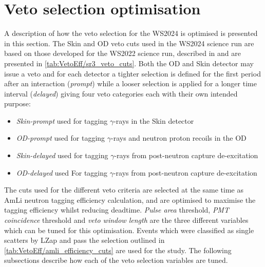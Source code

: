 \section{Veto selection optimisation}\label{sec:VetoEff/VetoSelectionOptimisation}
A description of how the veto selection for the WS2024 is optimised is presented in this section. The Skin and OD veto cuts used in the WS2024 science run are based on those developed for the WS2022 science run, described in \cite{LZ:2022lsv} and are presented in \autoref{tab:VetoEff/sr3_veto_cuts}.
Both the OD and Skin detector may issue a veto and for each detector a tighter selection is defined for the first period after an interaction (\textit{prompt}) while a looser selection is applied for a longer time interval (\textit{delayed}) giving four veto categories each with their own intended purpose:
\begin{itemize}
	\item \textit{Skin-prompt} used for tagging $\gamma$-rays in the Skin detector
	\item \textit{OD-prompt} used for tagging $\gamma$-rays and neutron proton recoils in the OD
	\item \textit{Skin-delayed} used for tagging $\gamma$-rays from post-neutron capture de-excitation
	\item \textit{OD-delayed} used For tagging $\gamma$-rays from post-neutron capture de-excitation
\end{itemize}
The cuts used for the different veto criteria are selected at the same time as AmLi neutron tagging efficiency calculation, and are optimised to maximise the tagging efficiency whilst reducing deadtime. \textit{Pulse area} threshold, \textit{PMT coincidence} threshold and \textit{veto window length} are the three different variables which can be tuned for this optimisation. Events which were classified as single scatters by LZap and pass the selection outlined in \autoref{tab:VetoEff/amli_efficiency_cuts} are used for the study. The following subsections describe how each of the veto selection variables are tuned.

